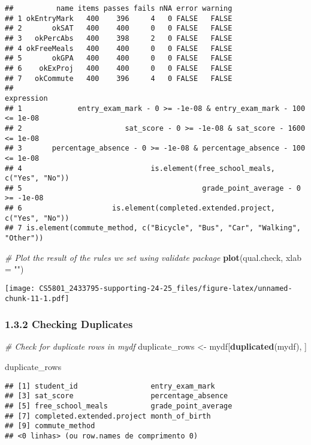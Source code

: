 \documentclass[
]{article}
\newenvironment{Shaded}{\begin{snugshade}}{\end{snugshade}}
\newcommand{\AttributeTok}[1]{\textcolor[rgb]{0.13,0.29,0.53}{#1}}
\newcommand{\CommentTok}[1]{\textcolor[rgb]{0.56,0.35,0.01}{\textit{#1}}}
\newcommand{\FunctionTok}[1]{\textcolor[rgb]{0.13,0.29,0.53}{\textbf{#1}}}
\newcommand{\NormalTok}[1]{#1}
\newcommand{\OtherTok}[1]{\textcolor[rgb]{0.56,0.35,0.01}{#1}}
\newcommand{\StringTok}[1]{\textcolor[rgb]{0.31,0.60,0.02}{#1}}
\begin{document}
\begin{verbatim}
##          name items passes fails nNA error warning
## 1 okEntryMark   400    396     4   0 FALSE   FALSE
## 2       okSAT   400    400     0   0 FALSE   FALSE
## 3   okPercAbs   400    398     2   0 FALSE   FALSE
## 4 okFreeMeals   400    400     0   0 FALSE   FALSE
## 5       okGPA   400    400     0   0 FALSE   FALSE
## 6    okExProj   400    400     0   0 FALSE   FALSE
## 7   okCommute   400    396     4   0 FALSE   FALSE
##                                                                   expression
## 1             entry_exam_mark - 0 >= -1e-08 & entry_exam_mark - 100 <= 1e-08
## 2                        sat_score - 0 >= -1e-08 & sat_score - 1600 <= 1e-08
## 3       percentage_absence - 0 >= -1e-08 & percentage_absence - 100 <= 1e-08
## 4                              is.element(free_school_meals, c("Yes", "No"))
## 5                                          grade_point_average - 0 >= -1e-08
## 6                     is.element(completed.extended.project, c("Yes", "No"))
## 7 is.element(commute_method, c("Bicycle", "Bus", "Car", "Walking", "Other"))
\end{verbatim}

\begin{Shaded}
\begin{Highlighting}[]
\CommentTok{\# Plot the result of the rules we set using validate package}
\FunctionTok{plot}\NormalTok{(qual.check, }\AttributeTok{xlab =} \StringTok{""}\NormalTok{)}
\end{Highlighting}
\end{Shaded}

\texttt{[image: CS5801\_2433795-supporting-24-25\_files/figure-latex/unnamed-chunk-11-1.pdf]}

\subsubsection{1.3.2 Checking Duplicates}\label{checking-duplicates}

\begin{Shaded}
\begin{Highlighting}[]
\CommentTok{\# Check for duplicate rows in mydf}
\NormalTok{duplicate\_rows }\OtherTok{\textless{}{-}}\NormalTok{ mydf[}\FunctionTok{duplicated}\NormalTok{(mydf), ]}

\NormalTok{duplicate\_rows}
\end{Highlighting}
\end{Shaded}

\begin{verbatim}
## [1] student_id                 entry_exam_mark           
## [3] sat_score                  percentage_absence        
## [5] free_school_meals          grade_point_average       
## [7] completed.extended.project month_of_birth            
## [9] commute_method            
## <0 linhas> (ou row.names de comprimento 0)
\end{verbatim}
\end{document}
